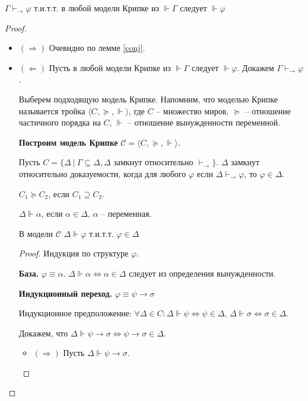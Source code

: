 \begin{theorem}
	\label{kripke}
	$\Gamma \vdash_\rightarrow \varphi$ т.и.т.т. в любой модели Крипке из $\Vdash \Gamma$ следует $\Vdash \varphi$
\end{theorem}
\begin{proof}\
	\begin{itemize}
		\item $(\Rightarrow)$ Очевидно по лемме \ref{conj}.
		\item $(\Leftarrow)$ Пусть в любой модели Крипке из $\Vdash \Gamma$ следует $\Vdash \varphi$. Докажем $\Gamma \vdash_\rightarrow \varphi$.
		
		Выберем подходящую модель Крипке. Напомним, что моделью Крипке называется тройка $\langle C, \succcurlyeq, \Vdash\rangle$, где $C$ -- множество миров, $\succcurlyeq$ -- отношение частичного порядка на $C$, $\Vdash$ -- отношение вынужденности переменной.
		
		\textbf{Построим модель Крипке} $\mathcal C = \langle C, \succcurlyeq, \Vdash \rangle$. 
		
		Пусть $C = \{\Delta \ |\ \Gamma \subseteq \Delta, \Delta \text{ замкнут относительно }\vdash_\rightarrow\}$. $\Delta$ замкнут относительно доказуемости, когда для любого $\varphi$ если $\Delta \vdash_\rightarrow \varphi$, то $\varphi \in \Delta$.
		
		$C_1 \succcurlyeq C_2$, если $C_1 \supseteq C_2$.
		
		$\Delta \Vdash \alpha$, если $\alpha \in \Delta$, $\alpha$ -- переменная.
		
		\begin{lemma}
			\label{mymodel}
			В модели $\mathcal C$ $\Delta \Vdash \varphi$ т.и.т.т. $\varphi \in \Delta$
		\end{lemma}
		\begin{proof}
			Индукция по структуре $\varphi$. 
			
			\textbf{База.} $\varphi \equiv \alpha$. $\Delta \Vdash \alpha \Leftrightarrow \alpha \in \Delta$ следует из определения вынужденности.
			
			\textbf{Индукционный переход.} $\varphi \equiv \psi \rightarrow \sigma$
			
			Индукционное предположение:
			$\forall \Delta \in C: \Delta \Vdash \psi \Leftrightarrow \psi \in \Delta$, $\Delta \Vdash \sigma \Leftrightarrow \sigma \in \Delta$.
			
			Докажем, что $\Delta \Vdash \psi \rightarrow \sigma \Leftrightarrow \psi \rightarrow \sigma \in \Delta$.
			\begin{itemize}
				\item $(\Rightarrow)$ Пусть $\Delta \Vdash \psi \rightarrow \sigma$.
				

\end{itemize}
\end{proof}
\end{itemize}
\end{proof}
